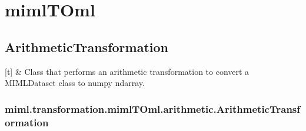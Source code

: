\documentclass[letterpaper,10pt,english]{sphinxmanual}
\begin{document}
\sphinxstepscope


\section{mimlTOml}
\label{\detokenize{transformation/mimlTOml/index:mimltoml}}\label{\detokenize{transformation/mimlTOml/index::doc}}
\sphinxstepscope


\subsection{ArithmeticTransformation}
\label{\detokenize{transformation/mimlTOml/arithmetic:arithmetictransformation}}\label{\detokenize{transformation/mimlTOml/arithmetic::doc}}

\begin{savenotes}\sphinxattablestart
\sphinxthistablewithglobalstyle
\sphinxthistablewithnovlinesstyle
\centering
\begin{tabulary}{\linewidth}[t]{}
\sphinxtoprule
\sphinxtableatstartofbodyhook
\sphinxAtStartPar
{\hyperref[\detokenize{transformation/mimlTOml/_autosummary/miml.transformation.mimlTOml.arithmetic.ArithmeticTransformation:miml.transformation.mimlTOml.arithmetic.ArithmeticTransformation}]{}}
&
\sphinxAtStartPar
Class that performs an arithmetic transformation to convert a MIMLDataset class to numpy ndarray.
\\
\sphinxbottomrule
\end{tabulary}
\sphinxtableafterendhook\par
\sphinxattableend\end{savenotes}

\sphinxstepscope


\subsubsection{miml.transformation.mimlTOml.arithmetic.ArithmeticTransformation}
\label{\detokenize{transformation/mimlTOml/_autosummary/miml.transformation.mimlTOml.arithmetic.ArithmeticTransformation:miml-transformation-mimltoml-arithmetic-arithmetictransformation}}\label{\detokenize{transformation/mimlTOml/_autosummary/miml.transformation.mimlTOml.arithmetic.ArithmeticTransformation::doc}}
\end{document}
